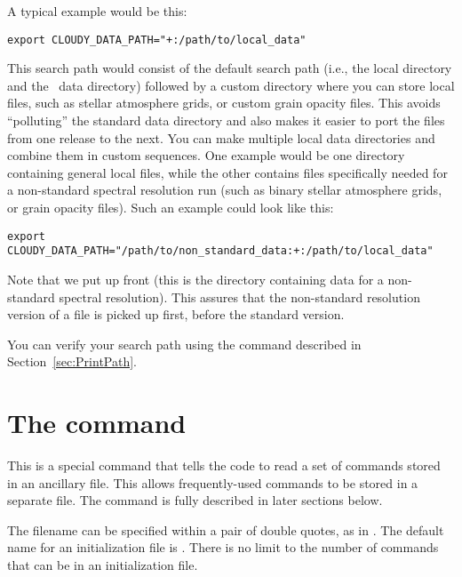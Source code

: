 A typical example would be this:
\begin{verbatim}
export CLOUDY_DATA_PATH="+:/path/to/local_data"
\end{verbatim}
This search path would consist of the default search path (i.e., the local
directory and the \Cloudy\ data directory) followed by a custom directory
 where you can store local files, such as
stellar atmosphere grids, or custom grain opacity files. This avoids
``polluting'' the standard data directory and also makes it easier to port the
files from one release to the next. You can make multiple local data
directories and combine them in custom sequences. One example would be one
directory containing general local files, while the other contains files
specifically needed for a non-standard spectral resolution run (such as binary
stellar atmosphere grids, or grain opacity files). Such an example could look
like this:
\begin{verbatim}
export CLOUDY_DATA_PATH="/path/to/non_standard_data:+:/path/to/local_data"
\end{verbatim}
Note that we put  up front (this is
the directory containing data for a non-standard spectral resolution). This
assures that the non-standard resolution version of a file is picked up first,
before the standard version.

You can verify your search path using the  command
described in Section~\ref{sec:PrintPath}.

\section{The  command}

\noindent
This is a special command that tells the code to read a set of commands
stored in an ancillary file.  This allows frequently-used commands to be
stored in a separate file.
The  command is fully described in later sections below.

The filename can be specified within a pair of double quotes, as in
.
The default name for an initialization file is
.
There is no limit to the number of commands that can be in an
initialization file.

